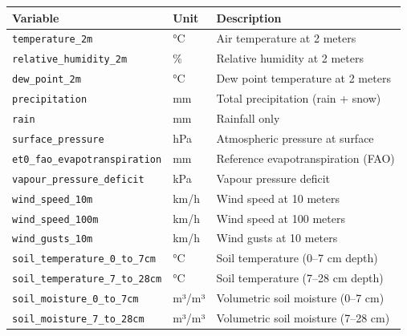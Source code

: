 \documentclass[
  letterpaper,
  DIV=11,
  numbers=noendperiod]{scrartcl}
\begin{document}
\begin{longtable}[]{@{}
  >{\raggedright\arraybackslash}p{}
  >{\raggedright\arraybackslash}p{}
  >{\raggedright\arraybackslash}p{}@{}}
\toprule\noalign{}
\begin{minipage}[b]{\linewidth}\raggedright
Variable
\end{minipage} & \begin{minipage}[b]{\linewidth}\raggedright
Unit
\end{minipage} & \begin{minipage}[b]{\linewidth}\raggedright
Description
\end{minipage} \\
\midrule\noalign{}
\endhead
\bottomrule\noalign{}
\endlastfoot
\texttt{temperature\_2m} & °C & Air temperature at 2 meters \\
\texttt{relative\_humidity\_2m} & \% & Relative humidity at 2 meters \\
\texttt{dew\_point\_2m} & °C & Dew point temperature at 2 meters \\
\texttt{precipitation} & mm & Total precipitation (rain + snow) \\
\texttt{rain} & mm & Rainfall only \\
\texttt{surface\_pressure} & hPa & Atmospheric pressure at surface \\
\texttt{et0\_fao\_evapotranspiration} & mm & Reference
evapotranspiration (FAO) \\
\texttt{vapour\_pressure\_deficit} & kPa & Vapour pressure deficit \\
\texttt{wind\_speed\_10m} & km/h & Wind speed at 10 meters \\
\texttt{wind\_speed\_100m} & km/h & Wind speed at 100 meters \\
\texttt{wind\_gusts\_10m} & km/h & Wind gusts at 10 meters \\
\texttt{soil\_temperature\_0\_to\_7cm} & °C & Soil temperature (0--7 cm
depth) \\
\texttt{soil\_temperature\_7\_to\_28cm} & °C & Soil temperature (7--28
cm depth) \\
\texttt{soil\_moisture\_0\_to\_7cm} & m³/m³ & Volumetric soil moisture
(0--7 cm) \\
\texttt{soil\_moisture\_7\_to\_28cm} & m³/m³ & Volumetric soil moisture
(7--28 cm) \\
\end{longtable}
\end{document}
